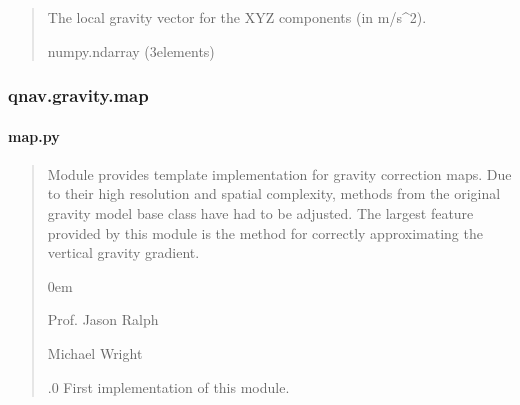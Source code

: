 \documentclass[letterpaper,10pt,english]{sphinxmanual}
\begin{document}
\begin{fulllineitems}
\begin{fulllineitems}
\begin{quote}
\begin{description}
\begin{itemize}
\end{itemize}

\sphinxAtStartPar
The local gravity vector for the XYZ components (in m/s\textasciicircum{}2).

\sphinxAtStartPar
numpy.ndarray (3\sphinxhyphen{}elements)

\end{description}\end{quote}

\end{fulllineitems}


\end{fulllineitems}


\sphinxstepscope


\subsubsection{qnav.gravity.map}
\label{\detokenize{modules/gravity/map:module-qnav.gravity.map}}\label{\detokenize{modules/gravity/map:qnav-gravity-map}}\label{\detokenize{modules/gravity/map::doc}}

\paragraph{map.py}
\label{\detokenize{modules/gravity/map:map-py}}\begin{quote}\begin{description}
\sphinxAtStartPar
Module provides template implementation for gravity correction maps.
Due to their high resolution and spatial complexity, methods from
the original gravity model base class have had to be adjusted.
The largest feature provided by this module is the method for
correctly approximating the vertical gravity gradient.

\begin{DUlineblock}{0em}
\item[] Prof. Jason Ralph \sphinxhyphen{} 
\item[] Michael Wright \sphinxhyphen{} 
\end{DUlineblock}

.0 \sphinxhyphen{} First implementation of this module.

\end{description}\end{quote}
\end{document}
